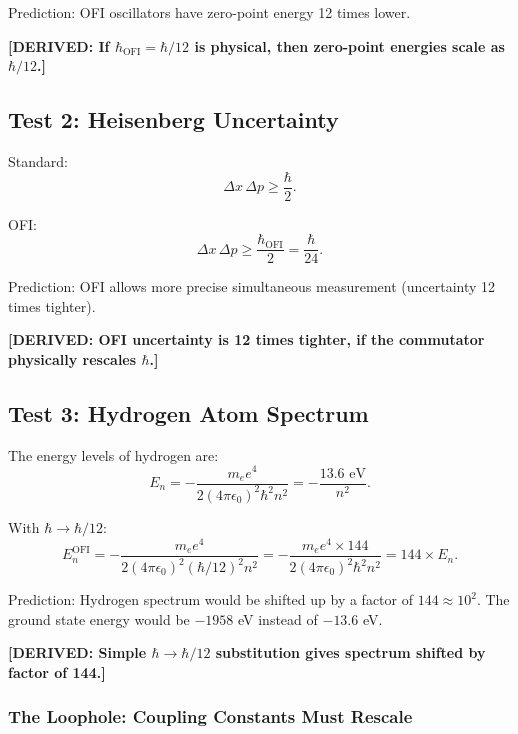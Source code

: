 \documentclass[12pt]{article}
\theoremstyle{definition}
\newcommand{\DERIVED}[1]{\textcolor{derivedcolor}{\textbf{[DERIVED: #1]}}}
\begin{document}
Prediction: OFI oscillators have zero-point energy 12 times lower.

\DERIVED{If $\hbar_{\mathrm{OFI}} = \hbar/12$ is physical, then zero-point energies scale
as $\hbar/12$.}

\subsection{Test 2: Heisenberg Uncertainty}

Standard:
\begin{equation}
  \Delta x \, \Delta p \geq \frac{\hbar}{2}.
\end{equation}

OFI:
\begin{equation}
  \Delta x \, \Delta p \geq \frac{\hbar_{\mathrm{OFI}}}{2} = \frac{\hbar}{24}.
\end{equation}

Prediction: OFI allows more precise simultaneous measurement (uncertainty 12 times tighter).

\DERIVED{OFI uncertainty is 12 times tighter, if the commutator physically rescales $\hbar$.}

\subsection{Test 3: Hydrogen Atom Spectrum}

The energy levels of hydrogen are:
\begin{equation}
  E_n = -\frac{m_e e^4}{2(4\pi\epsilon_0)^2 \hbar^2 n^2} = -\frac{13.6\text{ eV}}{n^2}.
\end{equation}

With $\hbar \to \hbar/12$:
\begin{equation}
  E_n^{\mathrm{OFI}} = -\frac{m_e e^4}{2(4\pi\epsilon_0)^2 (\hbar/12)^2 n^2}
  = -\frac{m_e e^4 \times 144}{2(4\pi\epsilon_0)^2 \hbar^2 n^2} = 144 \times E_n.
\end{equation}

Prediction: Hydrogen spectrum would be shifted up by a factor of $144 \approx 10^2$.
The ground state energy would be $-1958$ eV instead of $-13.6$ eV.

\DERIVED{Simple $\hbar \to \hbar/12$ substitution gives spectrum shifted by factor of 144.}

\subsubsection{The Loophole: Coupling Constants Must Rescale}
\end{document}
